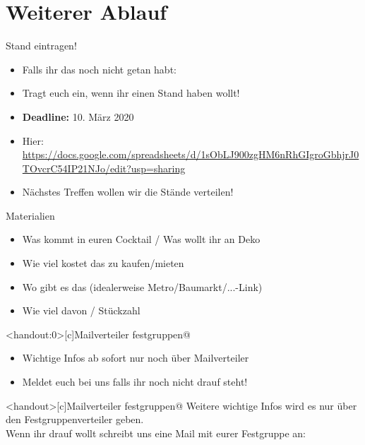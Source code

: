 \section{Weiterer Ablauf}


\begin{frame}[c]{Stand eintragen!}
    \begin{itemize}[<+(1)->]
        \item Falls ihr das noch nicht getan habt:
        \item Tragt euch ein, wenn ihr einen Stand haben wollt!
        \item \textbf{Deadline:} 10. März 2020
        \item Hier: \url{https://docs.google.com/spreadsheets/d/1sObLJ900zgHM6nRhGIgroGbhjrJ0TOvcrC54IP21NJo/edit?usp=sharing}
        \item<handout> Nächstes Treffen wollen wir die Stände verteilen!
    \end{itemize}
\end{frame}


\begin{frame}[c]{Materialien}
    \begin{itemize}[<+(1)->]
        \item Was kommt in euren Cocktail / Was wollt ihr an Deko
        \item Wie viel kostet das zu kaufen/mieten
        \item Wo gibt es das (idealerweise Metro/Baumarkt/...-Link)
        \item Wie viel davon / Stückzahl
    \end{itemize}
\end{frame}


\begin{frame}<handout:0>[c]{Mailverteiler festgruppen@}    
    \begin{itemize}[<+(1)->]
        \item Wichtige Infos ab sofort nur noch über Mailverteiler
        \item Meldet euch bei uns falls ihr noch nicht drauf steht!
    \end{itemize}
\end{frame}


\begin{frame}<handout>[c]{Mailverteiler festgruppen@}
    Weitere wichtige Infos wird es nur über den Festgruppenverteiler geben. \\
    Wenn ihr drauf wollt schreibt uns eine Mail mit eurer Festgruppe an:
\end{frame}


